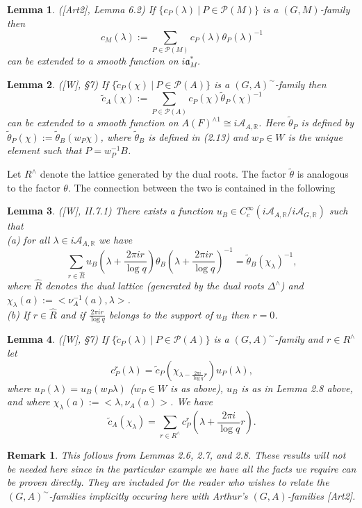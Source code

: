 \documentclass[12pt]{article}
\newtheorem{lemma}{Lemma}[section]
\newtheorem{remark}{Remark}
\begin{document}
\begin{lemma}
([Art2], Lemma 6.2) If $\{c_P(\lambda)\ |\ P\in\mathcal{P}(M)\}$ is a $(G,M)$-family then
\[
c_M(\lambda):=\sum_{P\in\mathcal{P}(M)}c_P(\lambda)\theta_P(\lambda)^{-1}
\]
can be extended to a smooth function on $i\mathfrak{a}^*_M$.
\end{lemma}

\begin{lemma}
([W], \S7) If $\{\tilde{c}_P(\chi)\ |\ P\in\mathcal{P}(A)\}$ is a $(G,A)^\sim$-family then
\[
\tilde{c}_A(\chi):=\sum_{P\in\mathcal{P}(A)}c_P(\chi)\tilde\theta_P(\chi)^{-1}
\]
can be extended to a smooth function on $A(F)^{\wedge1}\cong i\mathcal{A}_{A,\mathbb{R}}$. Here $\tilde\theta_P$ is defined by $\tilde\theta_P(\chi):=\tilde\theta_B(w_P\chi)$, where $\tilde\theta_B$ is defined in (2.13) and $w_P\in W$ is the unique element such that $P=w_P^{-1}B$.
\end{lemma}

Let $R^\wedge$ denote the lattice generated by the dual roots. The factor $\tilde\theta$ is analogous to the factor $\theta$. The connection between the two is contained in the following

\begin{lemma}
([W], II.7.1) There exists a function $u_B\in C^\infty_c(i\mathcal{A}_{A,\mathbb{R}}/i\mathcal{A}_{G,\mathbb{R}})$ such that\\
(a) for all $\lambda\in i\mathcal{A}_{A,\mathbb{R}}$ we have
\[
\sum_{r\in\hat{R}}u_B(\lambda+\frac{2\pi ir}{\log q})\theta_B(\lambda+\frac{2\pi ir}{\log q})^{-1}=\tilde\theta_B(\chi_\lambda)^{-1},
\]
where $\hat{R}$ denotes the dual lattice (generated by the dual roots $\Delta^\wedge$) and $\chi_\lambda(a):=<\nu_A^{-1}(a),\lambda>$.\\
(b) If $r\in\hat{R}$ and if $\frac{2\pi ir}{\log q}$ belongs to the support of $u_B$ then $r=0$.
\end{lemma}

\begin{lemma}
([W], \S7) If $\{\tilde{c}_P(\lambda)\ |\ P\in\mathcal{P}(A)\}$ is a $(G,A)^\sim$-family and $r\in R^\wedge$ let
\[
c_P^r(\lambda)=\tilde{c}_P(\chi_{\lambda-\frac{2\pi i}{\log q}r})u_P(\lambda),
\]
where $u_P(\lambda)=u_B(w_P\lambda)$ ($w_P\in W$ is as above), $u_B$ is as in Lemma 2.8 above, and where $\chi_\lambda(a):=<\lambda,\nu_A(a)>$. We have
\[
\tilde{c}_A(\chi_\lambda)=\sum_{r\in R^\wedge}c_P^r(\lambda+\frac{2\pi i}{\log q}r).
\]
\end{lemma}

\begin{remark}
This follows from Lemmas 2.6, 2.7, and 2.8. These results will not be needed here since in the particular example we have all the facts we require can be proven directly. They are included for the reader who wishes to relate the $(G,A)^\sim$-families implicitly occuring here with Arthur's $(G,A)$-families [Art2].
\end{remark}
\end{document}
